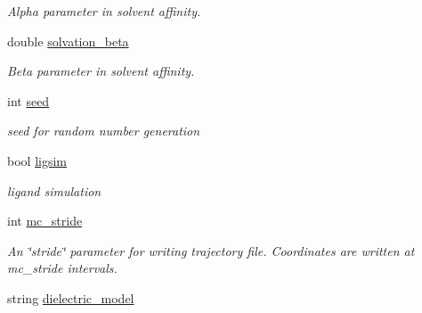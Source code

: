 \begin{DoxyCompactItemize}
\begin{DoxyCompactList}\small\item\em Alpha parameter in solvent affinity. \item\end{DoxyCompactList}\item 
\hypertarget{classPARSER_af5b49b26dca625c489fd8700e9b1c88f}{
double \hyperlink{classPARSER_af5b49b26dca625c489fd8700e9b1c88f}{solvation\_\-beta}}
\label{classPARSER_af5b49b26dca625c489fd8700e9b1c88f}

\begin{DoxyCompactList}\small\item\em Beta parameter in solvent affinity. \item\end{DoxyCompactList}\item 
\hypertarget{classPARSER_aeaf8bf9b52d3a318492b8d3e420b6742}{
int \hyperlink{classPARSER_aeaf8bf9b52d3a318492b8d3e420b6742}{seed}}
\label{classPARSER_aeaf8bf9b52d3a318492b8d3e420b6742}

\begin{DoxyCompactList}\small\item\em seed for random number generation \item\end{DoxyCompactList}\item 
\hypertarget{classPARSER_aeb9b56acb5c06a34abef9f3c37d31ee3}{
bool \hyperlink{classPARSER_aeb9b56acb5c06a34abef9f3c37d31ee3}{ligsim}}
\label{classPARSER_aeb9b56acb5c06a34abef9f3c37d31ee3}

\begin{DoxyCompactList}\small\item\em ligand simulation \item\end{DoxyCompactList}\item 
\hypertarget{classPARSER_a6bfc22c8f2f8f26bc27586ba3104fc24}{
int \hyperlink{classPARSER_a6bfc22c8f2f8f26bc27586ba3104fc24}{mc\_\-stride}}
\label{classPARSER_a6bfc22c8f2f8f26bc27586ba3104fc24}

\begin{DoxyCompactList}\small\item\em An \char`\"{}stride\char`\"{} parameter for writing trajectory file. Coordinates are written at mc\_\-stride intervals. \item\end{DoxyCompactList}\item 
\hypertarget{classPARSER_a2079483108b3b83d52007342863f3d68}{
string \hyperlink{classPARSER_a2079483108b3b83d52007342863f3d68}{dielectric\_\-model}}
\label{classPARSER_a2079483108b3b83d52007342863f3d68}


\end{DoxyCompactItemize}
